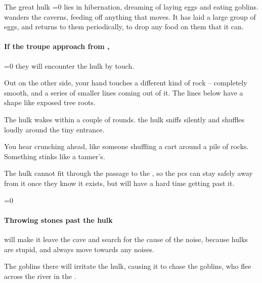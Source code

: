 \begin{multicols}{2}

\playCommentaryRestI
\playCommentaryRestII


\begin{exampletext}
  The great \gls{hulk}%
  \ifnum\value{temperature}=0
    lies in hibernation, dreaming of laying eggs and eating goblins.
  \else
    wanders the caverns, feeding off anything that moves.
    It has laid a large group of eggs, and returns to them periodically, to drop any food on them that it can.
  \fi
\end{exampletext}

\paragraph{If the troupe approach from ,}
\ifnum\value{temperature}=0%
  they will encounter the \gls{hulk} by touch.

  \begin{boxtext}
    Out on the other side, your hand touches a different kind of rock -- completely smooth, and a series of smaller lines coming out of it.
    The lines below have a shape like exposed tree roots.
  \end{boxtext}

  The \gls{hulk} wakes within a couple of \glspl{round}.
\else%
  the \gls{hulk} sniffs silently and shuffles loudly around the tiny entrance.

  \begin{boxtext}
    You hear crunching ahead, like someone shuffling a cart around a pile of rocks.
    Something stinks like a tanner's.
  \end{boxtext}
\fi

The \gls{hulk} cannot fit through the passage to the , so the \glspl{pc} can stay safely away from it once they know it exists, but will have a hard time getting past it.

\ifnum\value{temperature}=0\else
  \paragraph{Throwing stones past the \gls{hulk}}
  will make it leave the cave and search for the cause of the noise, because \glspl{hulk} are stupid, and always move towards any noises.
\fi

\umberhulk

The goblins there will irritate the \gls{hulk}, causing it to chase the goblins, who flee across the river in the .


\end{multicols}
